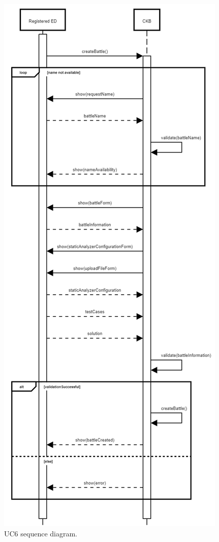 \begin{center}
  \begin{figure} [H]
    \begin{center}
        \includegraphics[width=\textwidth,height=\textheight,keepaspectratio]{Images/UseCaseDiagrams/UC6.png}
        \caption{UC6 sequence diagram.}
        \label{fig: UC6_sequence_diagram}
    \end{center}
  \end{figure}
\end{center}

